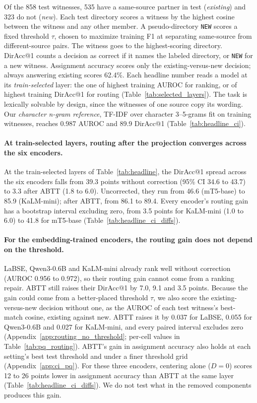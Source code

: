 \documentclass[11pt]{article}
\begin{document}
Of the 858 test witnesses, 535 have a same-source partner in test (\emph{existing}) and 323 do not (\emph{new}).
Each test directory scores a witness by the highest cosine between the witness and any other member.
A pseudo-directory \texttt{NEW} scores a fixed threshold $\tau$, chosen to maximize training F1 at separating same-source from different-source pairs.
The witness goes to the highest-scoring directory.
DirAcc@1 counts a decision as correct if it names the labeled directory, or \texttt{NEW} for a new witness.
Assignment accuracy scores only the existing-versus-new decision; always answering existing scores 62.4\%.
Each headline number reads a model at its \emph{train-selected} layer: the one of highest training AUROC for ranking, or of highest training DirAcc@1 for routing (Table~\ref{tab:selected_layers}).
The task is lexically solvable by design, since the witnesses of one source copy its wording.
Our \emph{character n-gram reference}, TF-IDF over character 3--5-grams fit on training witnesses, reaches 0.987 AUROC and 89.9 DirAcc@1 (Table~\ref{tab:headline_ci}).



\paragraph{At train-selected layers, routing after the projection converges across the six encoders.}
At the train-selected layers of Table~\ref{tab:headline}, the DirAcc@1 spread across the six encoders falls from 39.3 points without correction (95\% CI 34.6 to 43.7) to 3.3 after ABTT (1.8 to 6.0).
Uncorrected, they run from 46.6 (mT5-base) to 85.9 (KaLM-mini); after ABTT, from 86.1 to 89.4.
Every encoder's routing gain has a bootstrap interval excluding zero, from 3.5 points for KaLM-mini (1.0 to 6.0) to 41.8 for mT5-base (Table~\ref{tab:headline_ci_diffs}).

\paragraph{For the embedding-trained encoders, the routing gain does not depend on the threshold.}
LaBSE, Qwen3-0.6B and KaLM-mini already rank well without correction (AUROC 0.956 to 0.972), so their routing gain cannot come from a ranking repair.
ABTT still raises their DirAcc@1 by 7.0, 9.1 and 3.5 points.
Because the gain could come from a better-placed threshold $\tau$, we also score the existing-versus-new decision without one, as the AUROC of each test witness's best-match cosine, existing against new.
ABTT raises it by 0.037 for LaBSE, 0.055 for Qwen3-0.6B and 0.027 for KaLM-mini, and every paired interval excludes zero (Appendix~\ref{app:routing_no_threshold}; per-cell values in Table~\ref{tab:pq_routing}).
ABTT's gain in assignment accuracy also holds at each setting's best test threshold and under a finer threshold grid (Appendix~\ref{app:ci_pq}).
For these three encoders, centering alone ($D=0$) scores 12 to 26 points lower in assignment accuracy than ABTT at the same layer (Table~\ref{tab:headline_ci_diffs}).
We do not test what in the removed components produces this gain.
\end{document}
